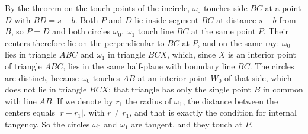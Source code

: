 {    By the theorem on the touch points of the incircle, $\omega_0$ touches side $BC$ at a point $D$ with $BD = s - b$. Both $P$ and $D$ lie inside segment $BC$ at distance $s - b$ from $B$, so $P = D$ and both circles $\omega_0$, $\omega_1$ touch line $BC$ at the same point $P$. Their centers therefore lie on the perpendicular to $BC$ at $P$, and on the same ray: $\omega_0$ lies in triangle $ABC$ and $\omega_1$ in triangle $BCX$, which, since $X$ is an interior point of triangle $ABC$, lies in the same half-plane with boundary line $BC$. The circles are distinct, because $\omega_0$ touches $AB$ at an interior point $W_0$ of that side, which does not lie in triangle $BCX$; that triangle has only the single point $B$ in common with line $AB$. If we denote by $r_1$ the radius of $\omega_1$, the distance between the centers equals $|r - r_1|$, with $r \neq r_1$, and that is exactly the condition for internal tangency. So the circles $\omega_0$ and $\omega_1$ are tangent, and they touch at $P$.
}

